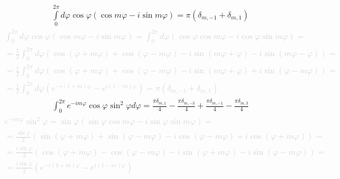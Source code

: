 %
\begin{equation} \begin{aligned}
\int \limits_{0}^{2\pi} d \varphi \cos \varphi 
( \cos m \varphi - i \sin m \varphi) = \pi ( \delta_{m,-1} + \delta_{m,1} )
\end{aligned} \end{equation}
%
\textcolor{lightgray}{ \begin{equation*} \begin{aligned}
\int_{0}^{2\pi} d \varphi \cos \varphi 
\left( \cos m \varphi - i \sin m \varphi \right) = \int_{0}^{2\pi} d \varphi
\left( \cos \varphi \cos m \varphi - i \cos \varphi \sin m \varphi \right) = \\
= \frac{1}{2} \int_{0}^{2\pi} d \varphi \left( 
\cos (\varphi + m \varphi) + \cos (\varphi - m \varphi) - 
i \sin (m \varphi + \varphi) - i \sin (m \varphi - \varphi) \right) = \\
= \frac{1}{2} \int_{0}^{2\pi} d \varphi \left( 
\cos (\varphi + m \varphi) + \cos (\varphi - m \varphi) - 
i \sin (m \varphi + \varphi) + i \sin (\varphi - m \varphi) \right) = \\
= \frac{1}{2} \int_{0}^{2\pi} d \varphi 
\left( e^{-i (1 + m) \varphi} - e^{i (1 - m) \varphi} \right) = 
\pi \left( \delta_{m,-1} + \delta_{m,1} \right)
\end{aligned} \end{equation*} }
%
\begin{equation} \begin{aligned}
\int_{0}^{2\pi} e^{-i m \varphi} \cos \varphi \sin^2 \varphi d \varphi = 
\frac{\pi \delta_{m,1} }{4}  - \frac{\pi \delta_{m,-3} }{4} + 
\frac{\pi \delta_{m,-1} }{4}  - \frac{\pi \delta_{m,3} }{4}
\end{aligned} \end{equation}
%
\textcolor{lightgray}{ \begin{equation*} \begin{aligned}
e^{-i m \varphi} \sin^2 \varphi = \sin \varphi \left( 
\sin \varphi \cos m \varphi - i \sin \varphi \sin m \varphi \right) = \\
= \frac{\sin \varphi}{2} \left( \sin (\varphi + m \varphi) + 
\sin (\varphi - m \varphi) - i \cos (\varphi - m \varphi) + 
i \cos (\varphi + m \varphi) \right) = \\ 
= \frac{i \sin \varphi}{2} \left( \cos (\varphi + m \varphi) - 
\cos (\varphi - m \varphi) - i \sin (\varphi + m \varphi) - 
i \sin (\varphi - m \varphi) \right) = \\
= \frac{i \sin \varphi}{2} \left( e^{-i(1+m)\varphi} - e^{i(1-m)\varphi} \right)
\end{aligned} \end{equation*} }
